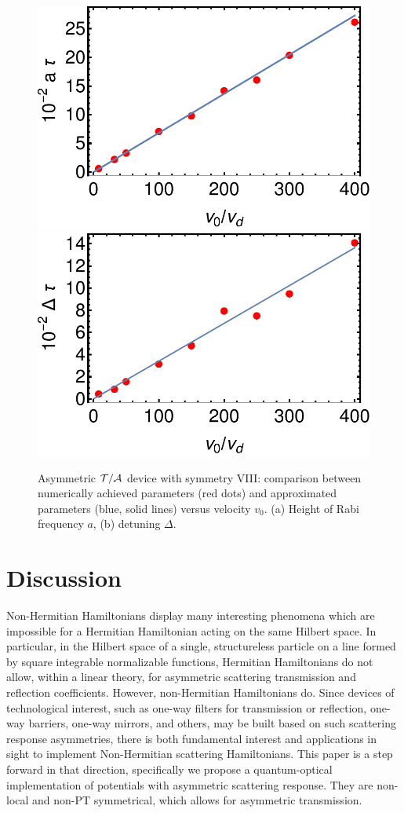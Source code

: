 \begin{figure}
	\begin{center}
		\includegraphics[width=0.48\linewidth]{Figures/asym_fig_t_a_param1.pdf}
		\includegraphics[width=0.48\linewidth]{Figures/asym_fig_t_a_param2.pdf}
	\end{center}
	\caption{Asymmetric ${\cal T/A}$ device with symmetry VIII: comparison between numerically achieved parameters (red dots) and approximated parameters (blue, solid lines) versus velocity $v_0$.
	(a) Height of Rabi frequency $a$, (b) detuning $\Delta$.
	\label{fig_t_a_param}}
\end{figure}

%
%
%
%

%
%
\section{Discussion\label{sec:chapter3_Discussion}}
Non-Hermitian Hamiltonians display many interesting phenomena which are
impossible for a  Hermitian Hamiltonian  acting on the same Hilbert space. In particular, in the Hilbert space of
a single, structureless particle on a line formed by square integrable normalizable functions, Hermitian Hamiltonians do not allow, within a linear theory, for asymmetric scattering transmission and reflection coefficients.
However,
non-Hermitian Hamiltonians do.   Since devices of technological interest, such as one-way filters for transmission or reflection, one-way barriers, one-way mirrors, and others, may be built based on such scattering response asymmetries, there is both fundamental
interest and applications in sight to implement Non-Hermitian scattering Hamiltonians.    This paper is a step forward in that direction, specifically we propose a quantum-optical implementation of potentials with asymmetric scattering response.
They are non-local and non-PT symmetrical, which allows for asymmetric transmission.

